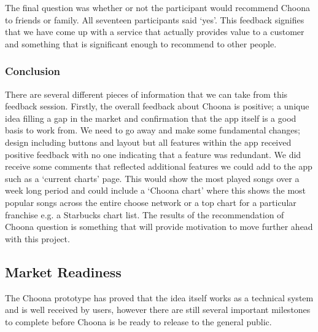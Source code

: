 The final question was whether or not the participant would recommend Choona to friends or family.  All seventeen participants said `yes'.  This feedback signifies that we have come up with a service that actually provides value to a customer and something that is significant enough to recommend to other people.

\subsubsection{Conclusion}
There are several different pieces of information that we can take from this feedback session.  Firstly, the overall feedback about Choona is positive; a unique idea filling a gap in the market and confirmation that the app itself is a good basis to work from.  We need to go away and make some fundamental changes; design including buttons and layout but all features within the app received positive feedback with no one indicating that a feature was redundant.  We did receive some comments that reflected additional features we could add to the app such as a `current charts' page.  This would show the most played songs over a week long period and could include a `Choona chart' where this shows the most popular songs across the entire choose network or a top chart for a particular franchise e.g. a Starbucks chart list.  The results of the recommendation of Choona question is something that will provide motivation to move further ahead with this project.

\subsection{Market Readiness}

The Choona prototype has proved that the idea itself works as a technical system and is well received by users, however there are still several important milestones to complete before Choona is be ready to release to the general public.

